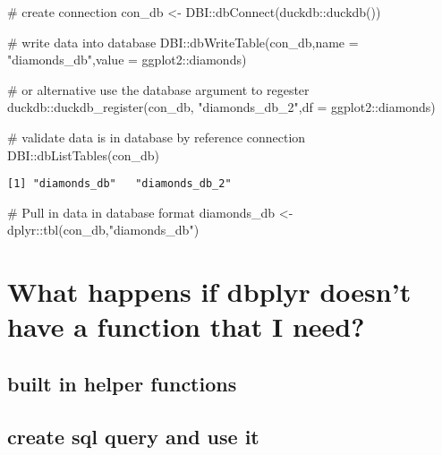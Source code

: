 \documentclass[
  letterpaper,
  DIV=11,
  numbers=noendperiod]{scrreprt}
\newenvironment{Shaded}{\begin{snugshade}}{\end{snugshade}}
\newcommand{\AttributeTok}[1]{\textcolor[rgb]{0.40,0.45,0.13}{#1}}
\newcommand{\CommentTok}[1]{\textcolor[rgb]{0.37,0.37,0.37}{#1}}
\newcommand{\FunctionTok}[1]{\textcolor[rgb]{0.28,0.35,0.67}{#1}}
\newcommand{\NormalTok}[1]{\textcolor[rgb]{0.00,0.23,0.31}{#1}}
\newcommand{\OtherTok}[1]{\textcolor[rgb]{0.00,0.23,0.31}{#1}}
\newcommand{\SpecialCharTok}[1]{\textcolor[rgb]{0.37,0.37,0.37}{#1}}
\newcommand{\StringTok}[1]{\textcolor[rgb]{0.13,0.47,0.30}{#1}}
\begin{document}
\begin{Shaded}
\begin{Highlighting}[]
\CommentTok{\# create connection}
\NormalTok{con\_db }\OtherTok{\textless{}{-}}\NormalTok{ DBI}\SpecialCharTok{::}\FunctionTok{dbConnect}\NormalTok{(duckdb}\SpecialCharTok{::}\FunctionTok{duckdb}\NormalTok{())}

\CommentTok{\# write data into database}
\NormalTok{DBI}\SpecialCharTok{::}\FunctionTok{dbWriteTable}\NormalTok{(con\_db,}\AttributeTok{name =} \StringTok{"diamonds\_db"}\NormalTok{,}\AttributeTok{value =}\NormalTok{ ggplot2}\SpecialCharTok{::}\NormalTok{diamonds)}

\CommentTok{\# or alternative use the database argument to regester}
\NormalTok{duckdb}\SpecialCharTok{::}\FunctionTok{duckdb\_register}\NormalTok{(con\_db, }\StringTok{"diamonds\_db\_2"}\NormalTok{,}\AttributeTok{df =}\NormalTok{  ggplot2}\SpecialCharTok{::}\NormalTok{diamonds)}

\CommentTok{\# validate data is in database by reference connection}
\NormalTok{DBI}\SpecialCharTok{::}\FunctionTok{dbListTables}\NormalTok{(con\_db)}
\end{Highlighting}
\end{Shaded}

\begin{verbatim}
[1] "diamonds_db"   "diamonds_db_2"
\end{verbatim}

\begin{Shaded}
\begin{Highlighting}[]
\CommentTok{\# Pull in data in database format}
\NormalTok{diamonds\_db }\OtherTok{\textless{}{-}}\NormalTok{ dplyr}\SpecialCharTok{::}\FunctionTok{tbl}\NormalTok{(con\_db,}\StringTok{"diamonds\_db"}\NormalTok{)}
\end{Highlighting}
\end{Shaded}

\section{What happens if dbplyr doesn't have a function that I
need?}\label{what-happens-if-dbplyr-doesnt-have-a-function-that-i-need}

\subsection{built in helper functions}\label{built-in-helper-functions}

\subsection{create sql query and use
it}\label{create-sql-query-and-use-it}
\end{document}
